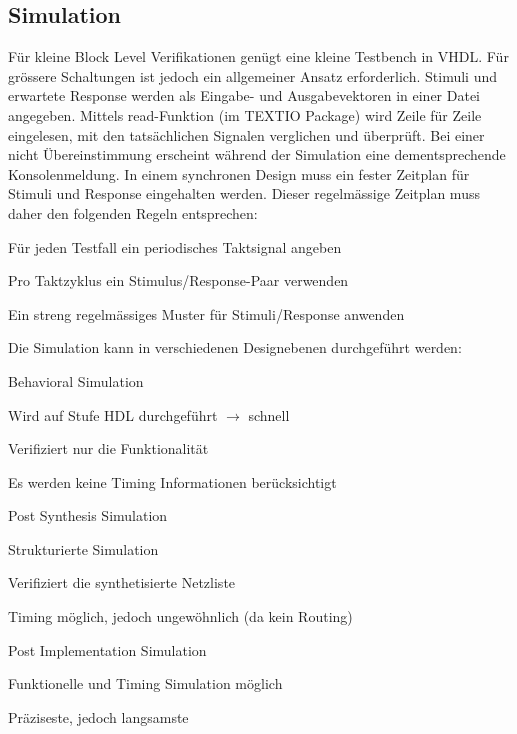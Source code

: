 \subsection{Simulation}
Für kleine Block Level Verifikationen genügt eine kleine Testbench in VHDL. Für grössere Schaltungen ist jedoch ein allgemeiner Ansatz erforderlich. Stimuli und erwartete Response werden als Eingabe- und Ausgabevektoren in einer Datei angegeben. Mittels read-Funktion (im TEXTIO Package) wird Zeile für Zeile eingelesen, mit den tatsächlichen Signalen verglichen und überprüft. Bei einer nicht Übereinstimmung erscheint während der Simulation eine dementsprechende Konsolenmeldung. In einem synchronen Design muss ein fester Zeitplan für Stimuli und Response eingehalten werden. Dieser regelmässige Zeitplan muss daher den folgenden Regeln entsprechen:
\begin{compactitem}
    \item Für jeden Testfall ein periodisches Taktsignal angeben
    \item Pro Taktzyklus ein Stimulus/Response-Paar verwenden
    \item Ein streng regelmässiges Muster für Stimuli/Response anwenden
\end{compactitem}

Die Simulation kann in verschiedenen Designebenen durchgeführt werden: 
\begin{multicols}{3}
    \begin{compactitem}
        \item Behavioral Simulation
        \begin{compactitem}
            \item Wird auf Stufe HDL durchgeführt $\rightarrow$ schnell 
            \item Verifiziert nur die Funktionalität
            \item Es werden keine Timing Informationen berücksichtigt
        \end{compactitem}
        \item Post Synthesis Simulation
        \begin{compactitem}
            \item Strukturierte Simulation
            \item Verifiziert die synthetisierte Netzliste 
            \item Timing möglich, jedoch ungewöhnlich (da kein Routing) \ \\
        \end{compactitem} 
        \item Post Implementation Simulation
        \begin{compactitem}
            \item Funktionelle und Timing Simulation möglich
            \item Präziseste, jedoch langsamste
        \end{compactitem} \ \\
    \end{compactitem}
\end{multicols}

